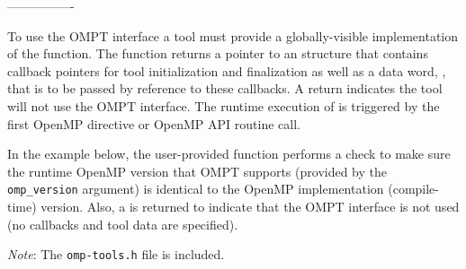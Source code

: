 ----------------

To use the OMPT interface a tool must provide a globally-visible implementation
of the  function.
The function returns a pointer to an  structure 
that contains callback pointers for tool initialization and finalization as well 
as a data word, , that is to be passed by reference to these callbacks.
A  return indicates the tool will not use the OMPT interface.
The runtime execution of  is triggered by the first OpenMP 
directive or OpenMP API routine call.


In the example below, the user-provided  function
performs a check to make sure the runtime OpenMP version that OMPT supports 
(provided by the \texttt{omp\_version} argument) is identical to the 
OpenMP implementation (compile-time) version.
Also, a  is returned to indicate that the OMPT interface is not
used (no callbacks and tool data are specified). 

\emph{Note}: The \texttt{omp-tools.h} file is included.

